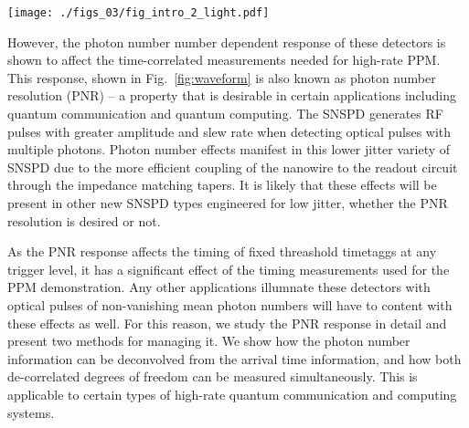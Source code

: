 \documentclass{optica-article}
\begin{document}
\texttt{[image: ./figs\_03/fig\_intro\_2\_light.pdf]}

However, the photon number number dependent response of these detectors is shown to affect the time-correlated measurements needed for high-rate PPM. This response, shown in Fig.~\ref{fig:waveform} is also known as photon number resolution (PNR) -- a property that is desirable in certain applications including quantum communication and quantum computing.
The SNSPD generates RF pulses with greater amplitude and slew rate when detecting optical pulses with multiple photons. Photon number effects manifest in this lower jitter variety of SNSPD due to the more efficient coupling of the nanowire to the readout circuit through the impedance matching tapers. It is likely that these effects will be present in other new SNSPD types engineered for low jitter, whether the PNR resolution is desired or not.

As the PNR response affects the timing of fixed threashold timetaggs at any trigger level, it has a significant effect of the timing measurements used for the PPM demonstration. Any other applications illumnate these detectors with optical pulses of non-vanishing mean photon numbers will have to content with these effects as well. For this reason, we study the PNR response in detail and present two methods for managing it. We show how the photon number information can be deconvolved from the arrival time information, and how both de-correlated degrees of freedom can be measured simultaneously. This is applicable to certain types of high-rate quantum communication and computing systems.
\end{document}
